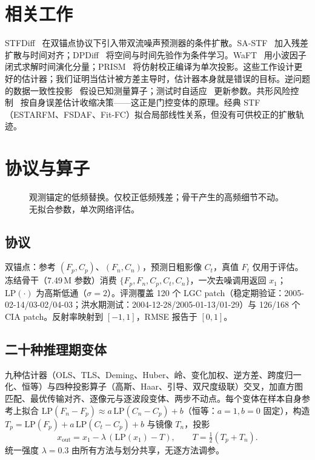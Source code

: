 \documentclass{article}
\begin{document}
\section{相关工作}
\label{sec:related}

STFDiff~\cite{huang2024stfdiff} 在双锚点协议下引入带双流噪声预测器的条件扩散。SA-STF~\cite{zhang2026sastf} 加入残差扩散与时间对齐；DPDiff~\cite{zhu2026dpdiff} 将空间与时间先验作为条件学习。WaFT~\cite{waft2026} 用小波因子闭式求解时间演化分量；PRISM~\cite{prism2026} 将仿射校正编译为单次投影。这些工作设计更好的估计器；我们证明当估计被方差主导时，估计器本身就是错误的目标。逆问题的数据一致性投影~\cite{chung2022ccdf,dcdp2026} 假设已知测量算子；测试时自适应~\cite{gou2024tao,tta_lst2026} 更新参数。共形风险控制~\cite{conformal2026} 按自身误差估计收缩决策——这正是门控变体的原理。经典 STF（ESTARFM、FSDAF、Fit-FC）拟合局部线性关系，但没有可供校正的扩散轨迹。

\section{协议与算子}
\label{sec:method}

\begin{figure}[t]
\centering
{}
\caption{观测锚定的低频替换。仅校正低频残差；骨干产生的高频细节不动。无拟合参数，单次网络评估。}
\label{fig:method}
\end{figure}

\subsection{协议}
双锚点：参考 $(F_p,C_p)$、$(F_n,C_n)$，预测日粗影像 $C_t$，真值 $F_t$ 仅用于评估。冻结骨干（7.49\,M 参数）消费 $\{F_p,F_n,C_p,C_t,C_n\}$，一次去噪调用返回 $x_1$；$\mathrm{LP}(\cdot)$ 为高斯低通（$\sigma{=}2$）。评测覆盖 120 个 LGC patch（稳定期验证：2005-02-14/03-02/04-03；洪水期测试：2004-12-28/2005-01-13/01-29）与 126/168 个 CIA patch。反射率映射到 $[-1,1]$，RMSE 报告于 $[0,1]$。

\subsection{二十种推理期变体}
九种估计器（OLS、TLS、Deming、Huber、岭、变化加权、逆方差、跨度归一化、恒等）与四种投影算子（高斯、Haar、引导、双尺度级联）交叉，加直方图匹配、最优传输对齐、逐像元与逐波段变体、两步不动点。每个变体在样本自身参考上拟合 $\mathrm{LP}(F_n{-}F_p)\approx a\,\mathrm{LP}(C_n{-}C_p)+b$（恒等：$a{=}1,b{=}0$ 固定），构造 $T_p=\mathrm{LP}(F_p)+a\,\mathrm{LP}(C_t{-}C_p)+b$ 与镜像 $T_n$，投影
\begin{equation}
x_{\mathrm{out}}=x_1-\lambda\,(\mathrm{LP}(x_1)-T),\qquad T=\tfrac12(T_p+T_n).
\label{eq:proj}
\end{equation}
统一强度 $\lambda{=}0.3$ 由所有方法与划分共享，无逐方法调参。
\end{document}
